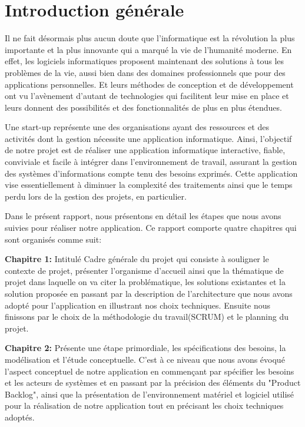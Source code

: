 
\chapter*{Introduction g\'{e}n\'{e}rale}


Il ne fait d\'{e}sormais plus aucun doute que l'informatique est la r\'{e}volution la
plus importante et la plus innovante qui a marqu\'{e} la vie de l'humanit\'{e}
moderne. En effet, les logiciels informatiques proposent maintenant des
solutions \`{a} tous les probl\`{e}mes de la vie, aussi bien dans des domaines
professionnels que pour des applications personnelles. Et leurs m\'{e}thodes de
conception et de d\'{e}veloppement ont vu l'av\`{e}nement d'autant de technologies
qui facilitent leur mise en place et leurs donnent des possibilit\'{e}s et des
fonctionnalit\'{e}s de plus en plus \'{e}tendues.


\bigskip
Une start-up repr\'{e}sente une des organisations ayant des ressources et des
activit\'{e}s dont la gestion n\'{e}cessite une application informatique. Ainsi,
l'objectif de notre projet est de r\'{e}aliser une application informatique
interactive, fiable, conviviale et facile \`{a} int\'{e}grer dans l'environnement de
travail, assurant la gestion des syst\`{e}mes d'informations compte tenu des
besoins exprim\'{e}s. Cette application vise essentiellement \`{a} diminuer la
complexit\'{e} des traitements ainsi que le temps perdu lors de la gestion des
projets, en particulier.

\bigskip


Dans le pr\'{e}sent rapport, nous pr\'{e}sentons en d\'{e}tail les \'{e}tapes que nous avons
suivies pour r\'{e}aliser notre application. Ce rapport comporte quatre chapitres
qui sont organis\'{e}s comme suit:

\bigskip
\textbf{Chapitre 1:}
Intitul\'{e} Cadre g\'{e}n\'{e}rale du projet qui consiste \`{a} souligner le contexte de projet,
pr\'{e}senter l'organisme d'accueil ainsi que la th\'{e}matique de projet dans
laquelle on va citer la probl\'{e}matique, les solutions existantes et la solution
propos\'{e}e en passant par la description de l'architecture que nous avons adopt\'{e} pour
l'application en illustrant nos choix techniques. Ensuite nous finissons
par le choix de la méthodologie du travail(SCRUM)  et le planning du projet.

\bigskip
\textbf{Chapitre 2:}
Pr\'{e}sente une \'{e}tape primordiale, les sp\'{e}cifications des besoins, la mod\'{e}lisation
et l'\'{e}tude conceptuelle. C'est \`{a} ce niveau que nous avons \'{e}voqu\'{e} l'aspect
conceptuel de notre application en commen\c{c}ant par sp\'{e}cifier les besoins et les
acteurs de syst\`{e}mes et en passant par la pr\'{e}cision des \'{e}l\'{e}ments du "Product Backlog",
ainsi que la pr\'{e}sentation de l'environnement mat\'{e}riel et logiciel utilis\'{e} pour la r\'{e}alisation
de notre application tout en pr\'{e}cisant les
choix techniques adopt\'{e}s.

